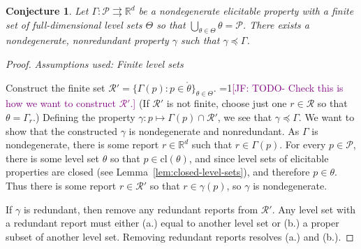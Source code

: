 \documentclass[12pt]{article}
\newcommand{\Comments}{1}
\newcommand{\mynote}[2]{\ifnum\Comments=1\textcolor{#1}{#2}\fi}
\newcommand{\jessie}[1]{\mynote{purple}{[JF: #1]}}
\newcommand{\reals}{\mathbb{R}}
\renewcommand{\P}{\mathcal{P}}
\newcommand{\R}{\mathcal{R}}
\newcommand{\inter}[1]{\mathring{#1}}%
\newcommand{\cl}[1]{\text{cl}(#1)}
\newcommand{\toto}{\rightrightarrows}
\newcommand{\card}{\textbf{card}}
\newtheorem{conjecture}{Conjecture}
\begin{document}
\begin{conjecture}\label{conj:gam-prime-exists}
	Let $\Gamma:\P \toto \reals^d$ be a nondegenerate elicitable property with a finite set of full-dimensional level sets $\Theta$ so that $\bigcup_{\theta \in \Theta}\theta = \P$.
	There exists a nondegenerate, nonredundant property $\gamma$ such that $\gamma \preceq \Gamma$. 
\end{conjecture}
\begin{proof}
\emph{Assumptions used: Finite level sets}

	
	Construct the finite set $\R' = \{\Gamma(p) : p \in \inter{\theta} \}_{\theta \in \Theta}$. \jessie{TODO- Check this is how we want to construct $\R'$.}
	(If $\R'$ is not finite, choose just one $r \in \R$ so that $\theta = \Gamma_r$.)
	Defining the property $\gamma : p \mapsto \Gamma(p) \cap \R'$, we see that $\gamma \preceq \Gamma$.
	We want to show that the constructed $\gamma$ is nondegenerate and nonredundant.
	As $\Gamma$ is nondegenerate, there is some report $r \in \reals^d$ such that $r \in \Gamma(p)$.
	For every $p \in \P$, there is some level set $\theta$ so that $p \in \cl{\theta}$, and since level sets of elicitable properties are closed (see Lemma~\ref{lem:closed-level-sets}), and therefore $p \in \theta$.
	Thus there is some report $r \in \R'$ so that $r \in \gamma(p)$, so $\gamma$ is nondegenerate.

	If $\gamma$ is redundant, then remove any redundant reports from $\R'$.
	Any level set with a redundant report must either (a.) equal to another level set or (b.) a proper subset of another level set. %
	Removing redundant reports resolves (a.) and (b.).
	

\end{proof}
\end{document}
